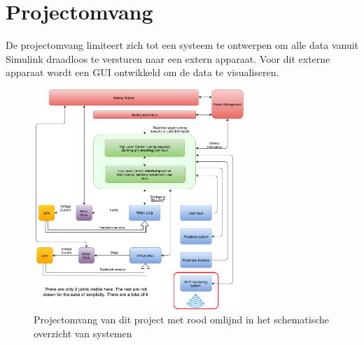 \section{Projectomvang}
De projectomvang limiteert zich tot een systeem te ontwerpen om alle data vanuit Simulink draadloos te versturen naar een extern apparaat. Voor dit externe apparaat wordt een GUI ontwikkeld om de data te visualiseren.
\begin{figure}[!ht]
	\centering
	\includegraphics[width=300px]{Scope}
	\caption{Projectomvang van dit project met rood omlijnd in het schematische overzicht van systemen}
\end{figure}
